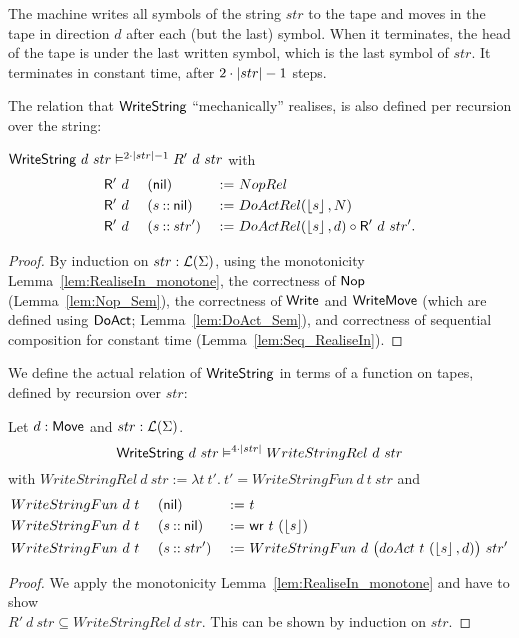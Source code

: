The machine writes all symbols of the string $str$ to the tape and moves in the tape in direction $d$ after each (but the last) symbol.  When it
terminates, the head of the tape is under the last written symbol, which is the last symbol of $str$.  It terminates in constant time, after
$2\cdot\left| str \right|-1$ steps.

The relation that $\mathsf{WriteString}$ ``mechanically'' realises, is also defined per recursion over the string:
\begin{lemma}
  $\mathsf{WriteString}~d~str \mathrel{\vDash^{2 \cdot \left| str \right| - 1}} R'~d~str$ with
  \begin{alignat*}{3}
    &\mathsf{R'}~d~&&(\mathsf{nil}        ) &~:=~& NopRel \\
    &\mathsf{R'}~d~&&(s \mathbin{::} \mathsf{nil}) &~:=~& DoActRel(\left\lfloor {s} \right\rfloor, N) \\
    &\mathsf{R'}~d~&&(s \mathbin{::} str') &~:=~& DoActRel(\left\lfloor {s} \right\rfloor, d) \circ \mathsf{R'}~d~str'.
  \end{alignat*}
\end{lemma}
\begin{proof}
  By induction on $str:\mathcal{L}(\Sigma)$, using the monotonicity Lemma~\ref{lem:RealiseIn_monotone}, the correctness of $\mathsf{Nop}$ (Lemma~\ref{lem:Nop_Sem}),
  the correctness of $\mathsf{Write}$ and $\mathsf{WriteMove}$ (which are defined using $\mathsf{DoAct}$; Lemma~\ref{lem:DoAct_Sem}), and correctness of
  sequential composition for constant time (Lemma~\ref{lem:Seq_RealiseIn}).
\end{proof}

We define the actual relation of $\mathsf{WriteString}$ in terms of a function on tapes, defined by recursion over $str$:
\begin{lemma}
  \label{lem:WriteString_Sem}
  Let $d:\mathsf{Move}$ and $str:\mathcal{L}(\Sigma)$.
  \[ \mathsf{WriteString}~d~str \mathrel{\vDash^{4\cdot\left| str \right|}} WriteStringRel~d~str \]
  with
  $WriteStringRel~d~str := \lambda t~t'.~t' = WriteStringFun~d~t~str$ and
  \begin{alignat*}{3}
    &WriteStringFun~d~t~&&(\mathsf{nil}        ) &~:=~& t \\
    &WriteStringFun~d~t~&&(s \mathbin{::} \mathsf{nil}) &~:=~& \mathsf{wr}~t~(\left\lfloor {s} \right\rfloor) \\
    &WriteStringFun~d~t~&&(s \mathbin{::} str') &~:=~& WriteStringFun~d~\bigl(doAct~t~(\left\lfloor {s} \right\rfloor, d)\bigr)~str'
  \end{alignat*}
\end{lemma}
\begin{proof}
  We apply the monotonicity Lemma~\ref{lem:RealiseIn_monotone} and have to show\\
  $R'~d~str \subseteq WriteStringRel~d~str$.  This can be shown by induction on $str$.
\end{proof}

